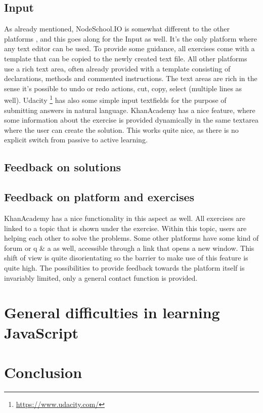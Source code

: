 \documentclass{article}
\begin{document}
\subsection{Input}
As already mentioned, NodeSchool.IO is somewhat different to the other platforms
, and this goes along for the Input as well. It's the only platform where any
text editor can be used. To provide some guidance, all exercises come with a 
template that can be copied to the newly created text file. All other platforms
use a rich text area, often already provided with a template consisting of 
declarations, methods and commented instructions. The text areas are rich in the
sense it's possible to undo or redo actions, cut, copy, select (multiple lines 
as well). Udacity
\footnote{\url{https://www.udacity.com/}} has also some simple input textfields
for the purpose of submitting answers in natural language. KhanAcademy has a
nice feature, where some information about the exercise is provided dynamically
in the same textarea where the user can create the solution. This works quite
nice, as there is no explicit switch from passive to active learning.

\subsection{Feedback on solutions}

\subsection{Feedback on platform and exercises}
KhanAcademy has a nice functionality in this aspect as well. All exercises are 
linked to a topic that is shown under the exercise. Within this topic, users are 
helping each other to solve the problems. Some other platforms have some kind
of forum or q \& a as well, accessible through a link that opens a new window. 
This shift of view is quite disorientating so the barrier to make use 
of this feature is quite high. The possibilities to provide feedback towards the 
platform itself is invariably limited, only a general contact function is 
provided. 

\section{General difficulties in learning JavaScript} 

\section{Conclusion} 
\end{document}
